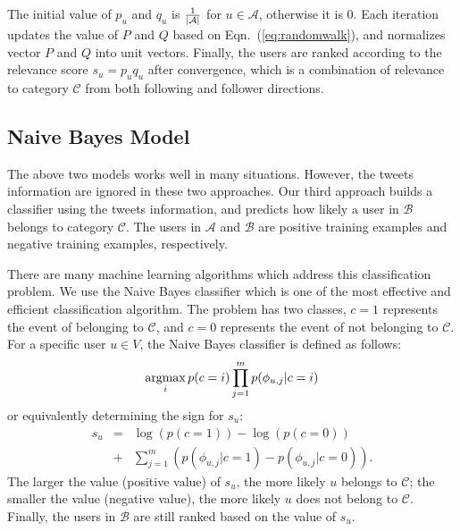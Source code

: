 \documentclass{article}
\begin{document}
The initial value of $p_u$ and $q_u$ is ${1 \over |\mathcal{A}|}$ for $u \in \mathcal{A}$, otherwise it is 0. Each iteration updates the value of $P$ and $Q$ based on Eqn.~(\ref{eq:randomwalk}), and normalizes vector $P$ and $Q$ into unit vectors. Finally, the users are ranked according to the relevance score $s_u = p_u q_u$ after convergence, which is a combination of relevance to category $\mathcal{C}$ from both following and follower directions.

\subsection{Naive Bayes Model}

The above two models works well in many situations. However, the tweets information are ignored in these two approaches. Our third approach builds a classifier using the tweets information, and predicts how likely a user in $\mathcal{B}$ belongs to category $\mathcal{C}$. The users in $\mathcal{A}$ and $\mathcal{B}$ are positive training examples and negative training examples, respectively.


There are many machine learning algorithms which address this classification problem. We use the Naive Bayes classifier \cite{bayes} which is one of the most effective and efficient classification algorithm. The problem has two classes, $c = 1$ represents the event of belonging to $\mathcal{C}$, and $c = 0$ represents the event of not belonging to $\mathcal{C}$. For a specific user $u \in V$, the Naive Bayes classifier is defined as follows:
$$\argmax_i p(c = i) \prod_{j=1}^m p(\phi_{u,j}|c = i)$$
or equivalently determining the sign for $s_u$:
\begin{eqnarray}\label{eq:bayes}
s_u & = & \log(p(c = 1)) - \log(p(c = 0)) \nonumber \\
    & + & \sum_{j=1}^m (p(\phi_{u,j}|c = 1) - p(\phi_{u,j}|c = 0)).
\end{eqnarray}
The larger the value (positive value) of $s_u$, the more likely $u$ belongs to $\mathcal{C}$; the smaller the value (negative value), the more likely $u$ does not belong to $\mathcal{C}$. Finally, the users in $\mathcal{B}$ are still ranked based on the value of $s_u$.
\end{document}
